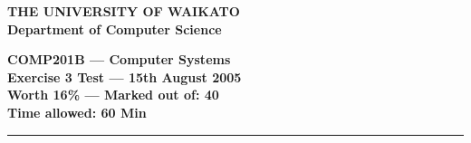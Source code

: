 \documentclass[a4paper,10pt]{article}
\begin{document}
\newcommand{\testmarks}[1]
{\begin{flushright}{\bf (#1 marks)}\end{flushright}}

{\centering \large \bf THE UNIVERSITY OF WAIKATO\\}
{\centering \large \bf Department of Computer Science\\[0.5cm]}

{\centering \large \bf COMP201B ---  Computer Systems\\}
{\centering \large \bf Exercise 3 Test --- 15th August 2005\\[0.3cm]}
{\centering \bf Worth 16\% --- Marked out of: 40\\[0.3cm]}
{\centering \bf Time allowed: 60 Min\\[1cm]}
\hrule
\end{document}

